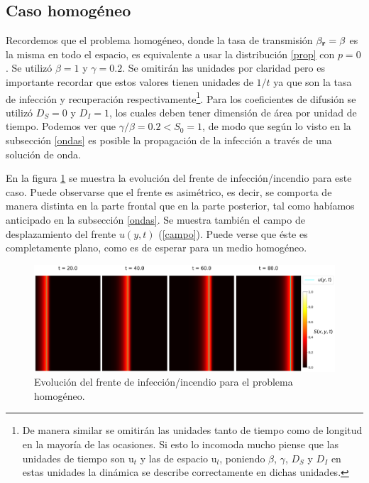 \subsection{Caso homogéneo}
\label{hom}
Recordemos que el problema homogéneo, donde la tasa de transmisión $\beta_{\vb r}=\beta$ es la misma en todo el espacio, es equivalente a usar la distribución 
\ref{prop} con $p=0$. Se utilizó $\beta = 1$ y $\gamma=0.2$. Se omitirán las unidades por claridad pero es importante recordar que estos valores tienen unidades 
de $1/t$ ya que son la tasa de infección y recuperación respectivamente\footnote{De manera similar se omitirán las unidades tanto de tiempo como de longitud en 
la mayoría de las ocasiones. Si esto lo incomoda mucho 
piense que las unidades de tiempo son u$_{t}$ y las de espacio u$_{l}$, poniendo $\beta$, $\gamma$, $D_{S}$ y $D_{I}$ en estas unidades la dinámica se describe 
correctamente en dichas unidades.}. Para los coeficientes de difusión se 
utilizó $D_{S}=0$ y $D_{I}=1$, los cuales deben tener dimensión de área por unidad de tiempo. Podemos ver que $\gamma/\beta=0.2<S_0=1$, de modo que según lo visto en 
la subsección \ref{ondas} es posible la propagación de la infección a través de una solución de onda.

En la figura \ref{fig:hom_case_tevol} se muestra la evolución del frente de infección/incendio para este caso. Puede observarse que el frente es asimétrico, es decir, se 
comporta de manera distinta en la parte frontal que en la parte posterior, tal como habíamos anticipado en la subsección \ref{ondas}. Se muestra también  el campo de 
desplazamiento del frente $u(y,t)$ (\ref{campo}). Puede verse que éste es completamente plano, como es de esperar para un medio homogéneo.

\begin{figure}[h]
    \centering
    \includegraphics[width=\imsizeL]{hom_case_tevol.pdf}
    \caption{Evolución del frente de infección/incendio para el problema homogéneo.}
    \label{fig:hom_case_tevol}
\end{figure}


